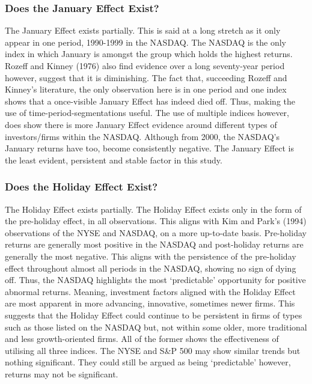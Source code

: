 \documentclass[11pt, english]{article}
\begin{document}
		\subsubsection{Does the January Effect Exist?}

		The January Effect exists partially. This is said at a long stretch as it only appear in one period, 1990-1999 in the NASDAQ. The NASDAQ is the only index in which January is amongst the group which holds the highest returns. Rozeff and Kinney (1976) also find evidence over a long seventy-year period however, suggest that it is diminishing. The fact that, succeeding Rozeff and Kinney’s literature, the only observation here is in one period and one index shows that a once-visible January Effect has indeed died off. Thus, making the use of time-period-segmentations useful. The use of multiple indices however, does show there is more January Effect evidence around different types of investors/firms within the NASDAQ. Although from 2000, the NASDAQ’s January returns have too, become consistently negative. The January Effect is the least evident, persistent and stable factor in this study. 

		\subsubsection{Does the Holiday Effect Exist?}

		The Holiday Effect exists partially. The Holiday Effect exists only in the form of the pre-holiday effect, in all observations. This aligns with Kim and Park’s (1994) observations of the NYSE and NASDAQ, on a more up-to-date basis. Pre-holiday returns are generally most positive in the NASDAQ and post-holiday returns are generally the most negative. This aligns with the persistence of the pre-holiday effect throughout almost all periods in the NASDAQ, showing no sign of dying off. Thus, the NASDAQ highlights the most `predictable’ opportunity for positive abnormal returns. Meaning, investment factors aligned with the Holiday Effect are most apparent in more advancing, innovative, sometimes newer firms. This suggests that the Holiday Effect could continue to be persistent in firms of types such as those listed on the NASDAQ but, not within some older, more traditional and less growth-oriented firms. All of the former shows the effectiveness of utilising all three indices. The NYSE and S\&P 500 may show similar trends but nothing significant. They could still be argued as being ‘predictable’ however, returns may not be significant.
\end{document}
